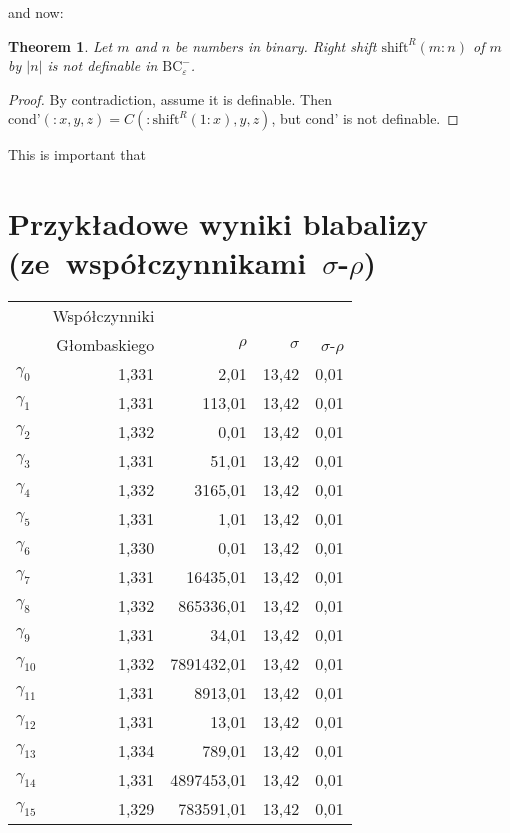 \documentclass[en]  {pracamgr}
\newcommand{\bcem}{\ensuremath{\text{BC}_{\varepsilon}^-}}
\newtheorem{thm}{Theorem}
\begin{document}
and now:
\begin{thm}
  Let $m$ and $n$ be numbers in binary. Right shift $\text{shift}^R(m:n)$ of $m$ by $|n|$ is not definable in \bcem.
\end{thm}
\begin{proof}
  By contradiction, assume it is definable. Then $\text{cond'}(:x, y, z) = C(: \text{shift}^R(1 : x), y, z)$, but cond' 
  is not definable.
\end{proof}

This is important that

\appendix

\chapter{Przykładowe wyniki blabalizy
  (ze~współczynnikami~$\sigma$-$\rho$)}

\begin{center}
  \begin{tabular}{lrrrr}
                  & Współczynniki                                           \\
                  & Głombaskiego  & $\rho$     & $\sigma$ & $\sigma$-$\rho$ \\
    $\gamma_{0}$  & 1,331         & 2,01       & 13,42    & 0,01            \\
    $\gamma_{1}$  & 1,331         & 113,01     & 13,42    & 0,01            \\
    $\gamma_{2}$  & 1,332         & 0,01       & 13,42    & 0,01            \\
    $\gamma_{3}$  & 1,331         & 51,01      & 13,42    & 0,01            \\
    $\gamma_{4}$  & 1,332         & 3165,01    & 13,42    & 0,01            \\
    $\gamma_{5}$  & 1,331         & 1,01       & 13,42    & 0,01            \\
    $\gamma_{6}$  & 1,330         & 0,01       & 13,42    & 0,01            \\
    $\gamma_{7}$  & 1,331         & 16435,01   & 13,42    & 0,01            \\
    $\gamma_{8}$  & 1,332         & 865336,01  & 13,42    & 0,01            \\
    $\gamma_{9}$  & 1,331         & 34,01      & 13,42    & 0,01            \\
    $\gamma_{10}$ & 1,332         & 7891432,01 & 13,42    & 0,01            \\
    $\gamma_{11}$ & 1,331         & 8913,01    & 13,42    & 0,01            \\
    $\gamma_{12}$ & 1,331         & 13,01      & 13,42    & 0,01            \\
    $\gamma_{13}$ & 1,334         & 789,01     & 13,42    & 0,01            \\
    $\gamma_{14}$ & 1,331         & 4897453,01 & 13,42    & 0,01            \\
    $\gamma_{15}$ & 1,329         & 783591,01  & 13,42    & 0,01            \\
  \end{tabular}
\end{center}
\end{document}
